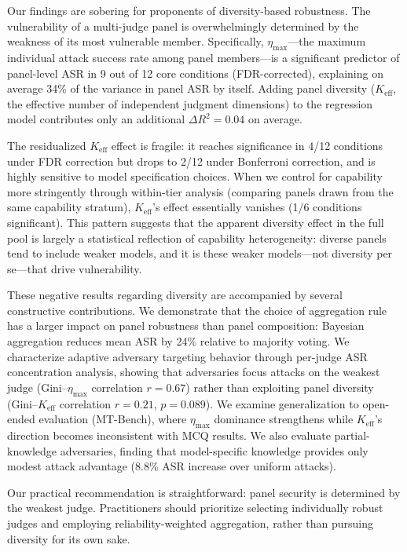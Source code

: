 \documentclass[11pt,a4paper]{article}
\begin{document}
Our findings are sobering for proponents of diversity-based robustness.
The vulnerability of a multi-judge panel is overwhelmingly determined by the weakness of its most vulnerable member.
Specifically, $\eta_{\max}$---the maximum individual attack success rate among panel members---is a significant predictor of panel-level ASR in 9 out of 12 core conditions (FDR-corrected), explaining on average 34\% of the variance in panel ASR by itself.
Adding panel diversity ($K_{\mathrm{eff}}$, the effective number of independent judgment dimensions) to the regression model contributes only an additional $\Delta R^2 = 0.04$ on average.

The residualized $K_{\mathrm{eff}}$ effect is fragile: it reaches significance in 4/12 conditions under FDR correction but drops to 2/12 under Bonferroni correction, and is highly sensitive to model specification choices.
When we control for capability more stringently through within-tier analysis (comparing panels drawn from the same capability stratum), $K_{\mathrm{eff}}$'s effect essentially vanishes (1/6 conditions significant).
This pattern suggests that the apparent diversity effect in the full pool is largely a statistical reflection of capability heterogeneity: diverse panels tend to include weaker models, and it is these weaker models---not diversity per se---that drive vulnerability.

These negative results regarding diversity are accompanied by several constructive contributions.
We demonstrate that the choice of aggregation rule has a larger impact on panel robustness than panel composition: Bayesian aggregation reduces mean ASR by 24\% relative to majority voting.
We characterize adaptive adversary targeting behavior through per-judge ASR concentration analysis, showing that adversaries focus attacks on the weakest judge (Gini--$\eta_{\max}$ correlation $r = 0.67$) rather than exploiting panel diversity (Gini--$K_{\mathrm{eff}}$ correlation $r = 0.21$, $p = 0.089$).
We examine generalization to open-ended evaluation (MT-Bench), where $\eta_{\max}$ dominance strengthens while $K_{\mathrm{eff}}$'s direction becomes inconsistent with MCQ results.
We also evaluate partial-knowledge adversaries, finding that model-specific knowledge provides only modest attack advantage (8.8\% ASR increase over uniform attacks).

Our practical recommendation is straightforward: panel security is determined by the weakest judge.
Practitioners should prioritize selecting individually robust judges and employing reliability-weighted aggregation, rather than pursuing diversity for its own sake.
\end{document}

